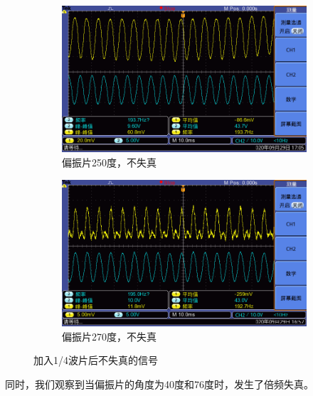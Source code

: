 \documentclass{ctexart}
\begin{document}
\begin{figure}[H]
  \centering
  \begin{subfigure}{.48\textwidth}
    \centering
    \includegraphics[width=\linewidth]{晶体电光调制图像/有波片/正弦信号484V250度/F0001TEK}
    \caption{偏振片250度，不失真}
  \end{subfigure}
  \begin{subfigure}{.48\textwidth}
    \centering
    \includegraphics[width=\linewidth]{晶体电光调制图像/有波片/正弦信号478V270度/F0000TEK}
    \caption{偏振片270度，不失真}
  \end{subfigure}
  \caption{加入1/4波片后不失真的信号}
\end{figure}

同时，我们观察到当偏振片的角度为40度和76度时，发生了倍频失真。
\end{document}
